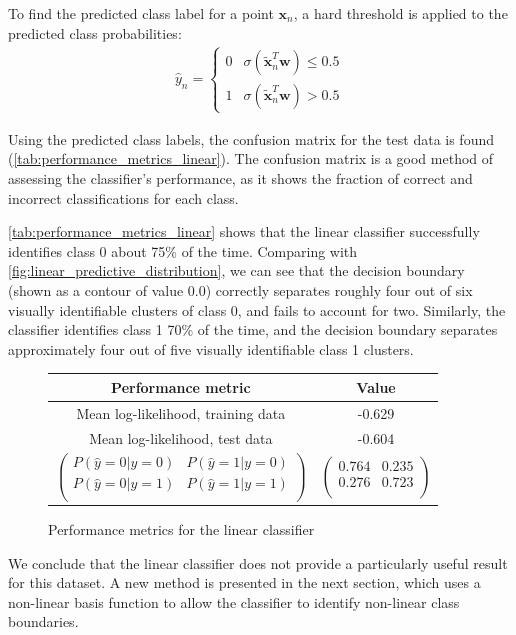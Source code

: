 \documentclass[a4paper]{article}
\begin{document}
    To find the predicted class label for a point $\boldsymbol{x}_n$, a hard threshold is applied to the predicted class
    probabilities:
    \begin{align*}
        \hat{y}_n = \begin{cases}
                        0 & \sigma(\tilde{\boldsymbol{x}}_n^T \boldsymbol{w}) \leq 0.5 \\
                        1 & \sigma(\tilde{\boldsymbol{x}}_n^T \boldsymbol{w}) > 0.5
                    \end{cases}
    \end{align*}

    Using the predicted class labels, the confusion matrix for the test data is found
    (\autoref{tab:performance_metrics_linear}). The confusion matrix is a good method of assessing the classifier's
    performance, as it shows the fraction of correct and incorrect classifications for each class.

    \autoref{tab:performance_metrics_linear} shows that the linear classifier successfully identifies class 0 about
    75\% of the time. Comparing with \autoref{fig:linear_predictive_distribution}, we can see that the decision boundary
    (shown as a contour of value 0.0) correctly separates roughly four out of six visually identifiable clusters of
    class 0, and fails to account for two. Similarly, the classifier identifies class 1 70\% of the time, and the
    decision boundary separates approximately four out of five visually identifiable class 1 clusters.

    \begin{figure}[h]
        \label{tab:performance_metrics_linear}
        \centering
        \begin{tabular}{c|c}
            \textbf{Performance metric} & \textbf{Value} \\
            \hline
            Mean log-likelihood, training data & -0.629 \\
            Mean log-likelihood, test data & -0.604 \\
            $\begin{pmatrix}
                 P(\hat{y}=0 | y=0) & P(\hat{y}=1 | y=0) \\
                 P(\hat{y}=0 | y=1) & P(\hat{y}=1 | y=1) \\
            \end{pmatrix}$ &
            $\begin{pmatrix}
                0.764 & 0.235 \\
                0.276 & 0.723 \\
            \end{pmatrix}$ \\
        \end{tabular}
        \caption{Performance metrics for the linear classifier}
    \end{figure}

    We conclude that the linear classifier does not provide a particularly useful result for this dataset.
    A new method is presented in the next section, which uses a non-linear basis function to allow the classifier to
    identify non-linear class boundaries.
\end{document}
